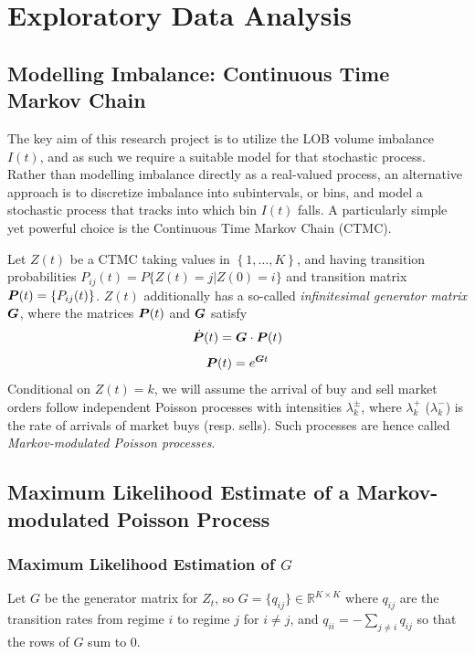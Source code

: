 \chapter{Exploratory Data Analysis}

\section{Modelling Imbalance: Continuous Time Markov Chain}
The key aim of this research project is to utilize the LOB volume imbalance $I(t)$, and as such we require a suitable model for that stochastic process. Rather than modelling imbalance directly as a real-valued process, an alternative approach is to discretize imbalance into subintervals, or bins, and model a stochastic process that tracks into which bin $I(t)$ falls. A particularly simple yet powerful choice is the Continuous Time Markov Chain (CTMC).

Let $Z(t)$ be a CTMC taking values in $\left\lbrace 1,\dots , K \right\rbrace$, and having transition probabilities $P_{ij}(t) = P \lbrace Z(t) = j | Z(0) = i \rbrace$ and transition matrix $\boldsymbol{P}(t) = \lbrace P_{ij}(t) \rbrace$. $Z(t)$ additionally has a so-called \textit{infinitesimal generator matrix} $\boldsymbol{G}$, where the matrices $\boldsymbol{P}(t)$ and $\boldsymbol{G}$ satisfy
\[\dot{\boldsymbol{P}}(t) = \boldsymbol{G} \cdot \boldsymbol{P}(t) \]
\[\boldsymbol{P}(t) = e^{\boldsymbol{G}t} \]
Conditional on $Z(t) = k$, we will assume the arrival of buy and sell market orders follow independent Poisson processes with intensities $\lambda_k^\pm$, where $\lambda_k^+$ ($\lambda_k^-$) is the rate of arrivals of market buys (resp. sells). Such processes are hence called \textit{Markov-modulated Poisson processes}.

\section{Maximum Likelihood Estimate of a Markov-modulated Poisson Process}

\subsection{Maximum Likelihood Estimation of \texorpdfstring{$G$}{G}}

Let $G$ be the generator matrix for $Z_t$, so $G = \{ q_{ij} \} \in \mathbb{R}^{K \times K}$ where $q_{ij}$ are the transition rates from regime $i$ to regime $j$ for $i\neq j$, and $q_{ii} = - \sum\limits_{j \neq i} q_{ij}$ so that the rows of $G$ sum to 0. 

